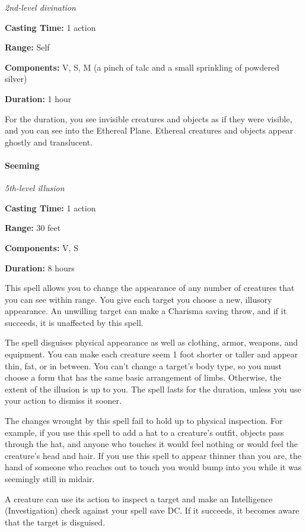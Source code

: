 \documentclass[
]{article}
\begin{document}
\emph{2nd-level divination}

\textbf{Casting Time:} 1 action

\textbf{Range:} Self

\textbf{Components:} V, S, M (a pinch of talc and a small sprinkling of
powdered silver)

\textbf{Duration:} 1 hour

For the duration, you see invisible creatures and objects as if they
were visible, and you can see into the Ethereal Plane. Ethereal
creatures and objects appear ghostly and translucent.

\hypertarget{seeming}{%
\paragraph{Seeming}\label{seeming}}

\emph{5th-level illusion}

\textbf{Casting Time:} 1 action

\textbf{Range:} 30 feet

\textbf{Components:} V, S

\textbf{Duration:} 8 hours

This spell allows you to change the appearance of any number of
creatures that you can see within range. You give each target you choose
a new, illusory appearance. An unwilling target can make a Charisma
saving throw, and if it succeeds, it is unaffected by this spell.

The spell disguises physical appearance as well as clothing, armor,
weapons, and equipment. You can make each creature seem 1 foot shorter
or taller and appear thin, fat, or in between. You can't change a
target's body type, so you must choose a form that has the same basic
arrangement of limbs. Otherwise, the extent of the illusion is up to
you. The spell lasts for the duration, unless you use your action to
dismiss it sooner.

The changes wrought by this spell fail to hold up to physical
inspection. For example, if you use this spell to add a hat to a
creature's outfit, objects pass through the hat, and anyone who touches
it would feel nothing or would feel the creature's head and hair. If you
use this spell to appear thinner than you are, the hand of someone who
reaches out to touch you would bump into you while it was seemingly
still in midair.

A creature can use its action to inspect a target and make an
Intelligence (Investigation) check against your spell save DC. If it
succeeds, it becomes aware that the target is disguised.
\end{document}
